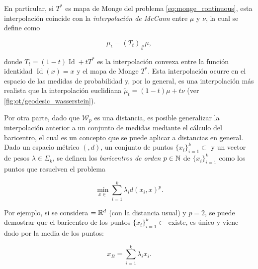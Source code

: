 En particular, si $T^*$ es mapa de Monge del problema \eqref{eq:monge_continuous}, esta interpolación coincide con la \textit{interpolación de McCann} entre $\mu$ y $\nu$, la cual se define como

\begin{equation}
	\label{eq:mccann_interpolation}
	\mu_t = (T_t)_\#\mu ,
\end{equation}

donde $T_t = (1-t)\operatorname{Id} + t T^*$ es la interpolación convexa entre la función identidad $\operatorname{Id}(x)=x$ y el mapa de Monge $T^*$. Esta interpolación ocurre en el espacio de las medidas de probabilidad y, por lo general, es una interpolación más realista que la interpolación euclidiana $\tilde{\mu}_t = (1-t)\mu + t\nu$ (ver \autoref{fig:ot/geodesic_wasserstein}).



Por otra parte, dado que $\mathcal{W}_p$ es una distancia, es posible generalizar la interpolación anterior a un conjunto de medidas mediante el cálculo del baricentro, el cual es un concepto que se puede aplicar a distancias en general. Dado un espacio métrico $(\xspace,d)$, un conjunto de puntos $\{x_i\}_{i=1}^k\subset\xspace$ y un vector de pesos $\lambda\in\Sigma_k$, se definen los \textit{baricentros de orden $p\in\mathbb{N}$} de $\{x_i\}_{i=1}^k$ como los puntos que resuelven el problema

\begin{equation}
	\label{eq:barycenter}
	\min_{x\in\xspace} \sum_{i=1}^k \lambda_i d(x_i,x)^p .
\end{equation}

Por ejemplo, si se considera $=\mathbb{R}^d$ (con la distancia usual) y $p=2$, se puede demostrar que el baricentro de los puntos $\{x_i\}_{i=1}^k\subset\xspace$ existe, es único y viene dado por la media de los puntos:

\begin{equation}
	\label{eq:barycenter_rd}
	x_B = \sum_{i=1}^k \lambda_i x_i .
\end{equation}

